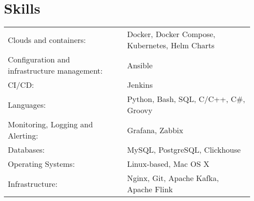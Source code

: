 \documentclass[a4paper,12pt]{article}
\begin{document}
    \section{Skills}
    \begin{tabularx}{\linewidth}{@{}l X@{}}
        Clouds and containers:  &  \normalsize{Docker, Docker Compose, Kubernetes, Helm Charts}\\
        Configuration and infrastructure management:  &  \normalsize{Ansible}\\
        CI/CD:  &  \normalsize{Jenkins}\\
        Languages:  &  \normalsize{Python, Bash, SQL, C/C++, C\#, Groovy}\\
        Monitoring, Logging and Alerting:  &  \normalsize{Grafana, Zabbix}\\
        Databases:  &  \normalsize{MySQL, PostgreSQL, Clickhouse}\\
        Operating Systems:  &  \normalsize{Linux-based, Mac OS X}\\
        Infrastructure:  &  \normalsize{Nginx, Git, Apache Kafka, Apache Flink}\\
    \end{tabularx}
\end{document}
